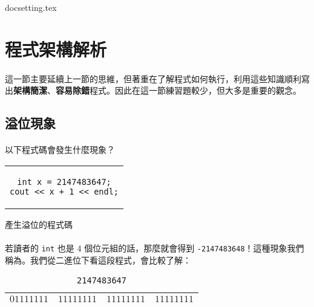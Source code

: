 \documentclass[12pt,a4paper,oneside]{article}
\begin{document}
\begin{CJK}{UTF8}{bkai}

{docsetting.tex}
\setcounter{section}{1}

\fi

\section{程式架構解析}

\paragraph{}這一節主要延續上一節的思維，但著重在了解程式如何執行，利用這些知識順利寫出\textbf{架構簡潔}、\textbf{容易除錯}程式。因此在這一節練習題較少，但大多是重要的觀念。

\subsection{溢位現象}

\paragraph{}以下程式碼會發生什麼現象？
\begin{code}[h!]
\centering
\begin{tabular}{c}
\begin{lstlisting}
int x = 2147483647;
cout << x + 1 << endl;
\end{lstlisting}
\end{tabular}
\caption{產生溢位的程式碼}
\label{program:struct:code:overflow}
\end{code}

\paragraph{}若讀者的 \lstinline!int! 也是 4 個位元組的話，那麼就會得到 \lstinline!-2147483648!！這種現象我們稱為。我們從二進位下看這段程式，會比較了解：

\begin{table}[h!]
\centering
\begin{tabular}{|c|c|c|c|}
\hline
$01111111$ & $11111111$ & $11111111$ & $11111111$\\
\hline
\end{tabular}
\caption{\lstinline!2147483647!}
\label{program:struct:table:binary:2147483647}
\end{table}


\end{CJK}
\end{document}
